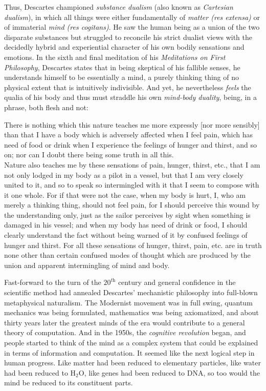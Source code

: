 Thus, Descartes championed \textit{substance dualism} (also known as \textit{Cartesian dualism}), in which all things were either fundamentally of \textit{matter (res extensa)} or of immaterial \textit{mind (res cogitans)}. He saw the human being as a union of the two disparate substances but struggled to reconcile his strict dualist views with the decidedly hybrid and experiential character of his own bodily sensations and emotions. In the sixth and final meditation of his \textit{Meditations on First Philosophy}, Descartes states that in being skeptical of his fallible senses, he understands himself to be essentially a mind, a purely thinking thing of no physical extent that is intuitively indivisible. And yet, he nevertheless \textit{feels} the qualia of his body and thus must straddle his own \textit{mind-body duality}, being, in a phrase, both flesh and not: \\
        
\begin{displayquote}
    There is nothing which this nature teaches me more expressly [nor more sensibly] than that I have a body which is adversely affected when I feel pain, which has need of food or drink when I experience the feelings of hunger and thirst, and so on; nor can I doubt there being some truth in all this. \\

    Nature also teaches me by these sensations of pain, hunger, thirst, etc., that I am not only lodged in my body as a pilot in a vessel, but that I am very closely united to it, and so to speak so intermingled with it that I seem to compose with it one whole. For if that were not the case, when my body is hurt, I, who am merely a thinking thing, should not feel pain, for I should perceive this wound by the understanding only, just as the sailor perceives by sight when something is damaged in his vessel; and when my body has need of drink or food, I should clearly understand the fact without being warned of it by confused feelings of hunger and thirst. For all these sensations of hunger, thirst, pain, etc. are in truth none other than certain confused modes of thought which are produced by the union and apparent intermingling of mind and body. \\
\end{displayquote}
        
Fast-forward to the turn of the $20^\textit{th}$ century and general confidence in the scientific method had annealed Descartes' mechanistic philosophy into full-blown metaphysical naturalism. The Modernist movement was in full swing, quantum mechanics was being formulated, mathematics was being axiomatized, and about thirty years later the greatest minds of the era would contribute to a general theory of computation. And in the 1950s, the \textit{cognitive revolution} began, and people started to think of the mind as a complex system that could be explained in terms of information and computation. It seemed like the next logical step in human progress. Like matter had been reduced to elementary particles, like water had been reduced to H$_2$O, like genes had been reduced to DNA, so too would the mind be reduced to its constituent parts. \\
        
